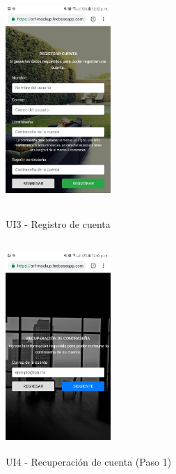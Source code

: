 \begin{figure}[h!]
	\begin{minipage}{0.48\textwidth}
		\centering
		\includegraphics[width=4cm,height=8cm]{imagenes/Anexos/Mockup/registrar.jpg}
		\caption{UI3 - Registro de cuenta}
		\label{fig:register}
	\end{minipage}\hfill
	\begin{minipage}{0.48\textwidth}
		\centering
		\includegraphics[width=4cm,height=8cm]{imagenes/Anexos/Mockup/rec01.jpg}
		\caption{UI4 - Recuperación de cuenta (Paso 1)}
		\label{fig:rec01}
	\end{minipage}\hfill
\end{figure}

